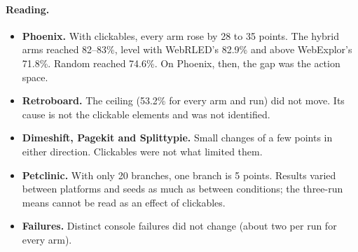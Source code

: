 \begin{table}[H]
\centering
\small
\caption{Post-hoc follow-up: branch coverage (\%, mean of three one-hour runs) without and
with custom clickables, all on the same hardware.}
\label{tab:followup}
\end{table}

\paragraph{Reading.}
\begin{itemize}
  \item \textbf{Phoenix.} With clickables, every arm rose by 28 to 35 points. The hybrid arms
        reached 82--83\%, level with WebRLED's 82.9\% and above WebExplor's 71.8\%. Random
        reached 74.6\%. On Phoenix, then, the gap was the action space.
  \item \textbf{Retroboard.} The ceiling (53.2\% for every arm and run) did not move. Its
        cause is not the clickable elements and was not identified.
  \item \textbf{Dimeshift, Pagekit and Splittypie.} Small changes of a few points in either
        direction. Clickables were not what limited them.
  \item \textbf{Petclinic.} With only 20 branches, one branch is 5 points. Results varied
        between platforms and seeds as much as between conditions; the three-run means
        cannot be read as an effect of clickables.
  \item \textbf{Failures.} Distinct console failures did not change (about two per run for
        every arm).
\end{itemize}

